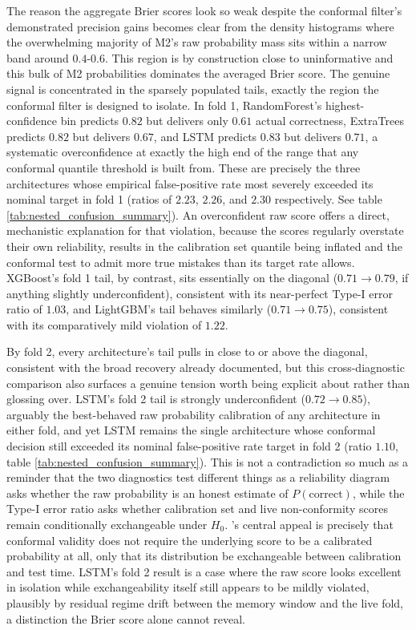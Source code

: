 \documentclass[12pt, a4paper]{article}
\begin{document}
The reason the aggregate Brier scores look so weak despite the conformal filter's demonstrated precision gains becomes clear from the density histograms where the overwhelming 
majority of M2's raw probability mass sits within a narrow band around $0.4$-$0.6$. This region is by construction close to uninformative and this bulk of M2 probabilities 
dominates the averaged Brier score. The genuine signal is concentrated in the sparsely populated tails, exactly the region the conformal filter is 
designed to isolate. In fold 1, RandomForest's highest-confidence bin predicts $0.82$ but delivers only $0.61$ actual correctness, ExtraTrees predicts $0.82$ but 
delivers $0.67$, and LSTM predicts $0.83$ but delivers $0.71$, a systematic overconfidence at exactly the high end of the range that any conformal quantile threshold is built 
from. These are precisely the three architectures whose empirical false-positive rate most severely exceeded its nominal target in fold 1 (ratios of $2.23$, $2.26$, and $2.30$ 
respectively. See table \ref{tab:nested_confusion_summary}). An overconfident raw score offers a direct, mechanistic explanation for that violation, because the scores regularly 
overstate their own reliability, results in the calibration set quantile being inflated and the conformal test to admit more true mistakes than its target rate allows. 
XGBoost's fold 1 tail, by contrast, sits essentially on the diagonal ($0.71 \to 0.79$, if anything slightly underconfident), consistent with its near-perfect Type-I error ratio of 
$1.03$, and LightGBM's tail behaves similarly ($0.71 \to 0.75$), consistent with its comparatively mild violation of $1.22$.

\medskip

By fold 2, every architecture's tail pulls in close to or above the diagonal, consistent with the broad recovery already documented, but this cross-diagnostic comparison also 
surfaces a genuine tension worth being explicit about rather than glossing over. LSTM's fold 2 tail is strongly underconfident ($0.72 \to 0.85$), arguably the best-behaved raw 
probability calibration of any architecture in either fold, and yet LSTM remains the single architecture whose conformal decision still exceeded its nominal false-positive rate 
target in fold 2 (ratio $1.10$, table \ref{tab:nested_confusion_summary}). This is not a contradiction so much as a reminder that the two diagnostics test different things as a 
reliability diagram asks whether the raw probability is an honest estimate of $P(\text{correct})$, while the Type-I error ratio asks whether calibration set and live 
non-conformity scores remain conditionally exchangeable under $H_0$. 
\textcite[377 ff.]{shafer_tutorial_2008}'s central appeal is precisely that conformal validity does not require the underlying score to be a 
calibrated probability at all, only that its distribution be exchangeable between calibration and test time. LSTM's fold 2 result is a case where the raw score looks excellent 
in isolation while exchangeability itself still appears to be mildly violated, plausibly by residual regime drift between the memory window and the live fold, a distinction the 
Brier score alone cannot reveal.
\end{document}
